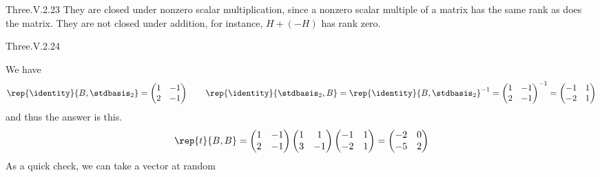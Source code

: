 \begin{ans}{Three.V.2.23}
      They are closed under nonzero scalar multiplication, since
      a nonzero scalar multiple of a matrix has the same rank as does the
      matrix.
      They are not closed under addition,
      for instance, \( H+(-H) \) has rank zero.
    
\end{ans}
\begin{ans}{Three.V.2.24}
      \begin{exparts}
        \partsitem We have
          \begin{equation*}
            \rep{\identity}{B,\stdbasis_2}=
            \begin{pmatrix}
              1  &-1  \\
              2  &-1
            \end{pmatrix}
            \qquad
            \rep{\identity}{\stdbasis_2,B}=\rep{\identity}{B,\stdbasis_2}^{-1}=
            \begin{pmatrix}
              1  &-1  \\
              2  &-1
            \end{pmatrix}^{-1}
            =\begin{pmatrix}
              -1  &1  \\
              -2  &1
            \end{pmatrix}
          \end{equation*}
          and thus the answer is this.
          \begin{equation*}
            \rep{t}{B,B}
            =
            \begin{pmatrix}
              1  &-1  \\
              2  &-1
            \end{pmatrix}
            \begin{pmatrix}
              1  &1  \\
              3  &-1
            \end{pmatrix}
            \begin{pmatrix}
              -1  &1  \\
              -2  &1
            \end{pmatrix}
            =\begin{pmatrix}
              -2  &0   \\
              -5  &2
            \end{pmatrix}
          \end{equation*}
          As a quick check, we can take a vector at random

\end{exparts}
\end{ans}
